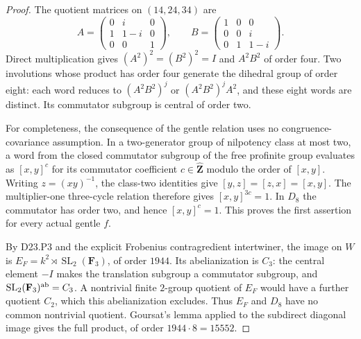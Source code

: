 \begin{proof}
The quotient matrices on $(14,24,34)$ are
\[
 A=\begin{pmatrix}0&i&0\\1&1-i&0\\0&0&1\end{pmatrix},
 \qquad
 B=\begin{pmatrix}1&0&0\\0&0&i\\0&1&1-i\end{pmatrix}.
\]
Direct multiplication gives $(A^2)^2=(B^2)^2=I$ and
$A^2B^2$ of order four.  Two involutions whose product has
order four generate the dihedral group of order eight:
each word reduces to $(A^2B^2)^j$ or $(A^2B^2)^jA^2$,
and these eight words are distinct.  Its commutator subgroup
is central of order two.

For completeness, the consequence of the gentle relation
uses no congruence-covariance assumption.  In a two-generator
group of nilpotency class at most two, a word from the closed
commutator subgroup of the free profinite group evaluates
as $[x,y]^c$ for its commutator coefficient
$c\in\widehat{\mathbf Z}$ modulo the order of $[x,y]$.
Writing $z=(xy)^{-1}$, the class-two identities give
$[y,z]=[z,x]=[x,y]$.  The multiplier-one three-cycle relation
therefore gives $[x,y]^{3c}=1$.  In $D_8$ the commutator has
order two, and hence $[x,y]^c=1$.  This proves the first
assertion for every actual gentle $f$.

By D23.P3 and the explicit Frobenius contragredient
intertwiner, the image on $W$ is
$E_F=k^2\rtimes\operatorname{SL}_2(\mathbf F_3)$, of order
$1944$.  Its abelianization is $C_3$: the central element
$-I$ makes the translation subgroup a commutator subgroup,
and $\operatorname{SL}_2(\mathbf F_3)^{\rm ab}=C_3$.
A nontrivial finite $2$-group quotient of $E_F$ would have
a further quotient $C_2$, which this abelianization excludes.
Thus $E_F$ and $D_8$ have no common nontrivial quotient.
Goursat's lemma applied to the subdirect diagonal image
gives the full product, of order $1944\cdot8=15552$.


\end{proof}
